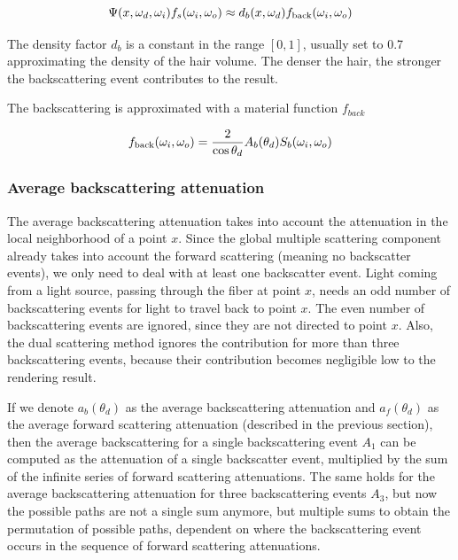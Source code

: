 \begin{equation}
\Psi(x, \omega_d, \omega_i) f_s(\omega_i, \omega_o) \approx d_b(x, \omega_d) f_{\textnormal{back}}(\omega_i, \omega_o)
\end{equation}

The density factor $d_b$ is a constant in the range $[0, 1]$, usually set to 0.7 approximating the density of the hair volume. The denser the hair, the stronger the backscattering event contributes to the result.

The backscattering is approximated with a material function $f_{back}$

\begin{equation}
f_{\textnormal{back}}(\omega_i, \omega_o) = \frac{2}{\cos \theta_d}A_b(\theta_d) S_b(\omega_i, \omega_o)
\end{equation}

\subsubsection{Average backscattering attenuation}

The average backscattering attenuation takes into account the attenuation in the local neighborhood of a point $x$. Since the global multiple scattering component already takes into account the forward scattering (meaning no backscatter events), we only need to deal with at least one backscatter event. Light coming from a light source, passing through the fiber at point $x$, needs an odd number of backscattering events for light to travel back to point $x$. The even number of backscattering events are ignored, since they are not directed to point $x$. Also, the dual scattering method ignores the contribution for more than three backscattering events, because their contribution becomes negligible low to the rendering result. 

If we denote $a_b(\theta_d)$ as the average backscattering attenuation and $a_f(\theta_d)$ as the average forward scattering attenuation (described in the previous section), then the average backscattering for a single backscattering event $A_1$ can be computed as the attenuation of a single backscatter event, multiplied by the sum of the infinite series of forward scattering attenuations. The same holds for the average backscattering attenuation for three backscattering events $A_3$, but now the possible paths are not a single sum anymore, but multiple sums to obtain the permutation of possible paths, dependent on where the backscattering event occurs in the sequence of forward scattering attenuations.

